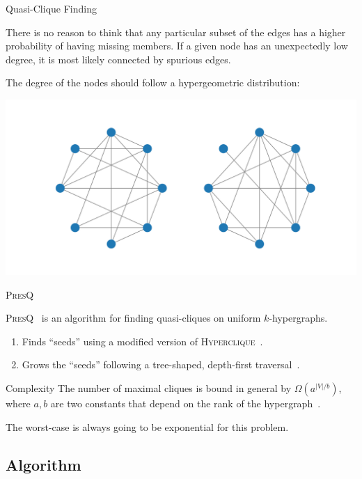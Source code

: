 \documentclass[10pt]{beamer}
\newcommand{\PresQ}[0]{\textsc{PresQ}\xspace}
\begin{document}
\begin{frame}{Quasi-Clique Finding}
    \begin{block}{}
    There is no reason to think that any particular subset of the edges
    has a higher probability of having missing members. If a given node has an
    unexpectedly low degree, it is most likely connected by spurious edges.
    
    The degree of the nodes should follow a hypergeometric distribution:
    \end{block}
    \centering
    \includegraphics[width=0.7\linewidth]{quasicliques}
\end{frame}

\begin{frame}{\PresQ}

    \begin{block}{}
    \PresQ~\cite{AlvarezAyllonPresQ2022} is an algorithm for finding quasi-cliques on uniform
    $k$-hypergraphs.
    
    \begin{enumerate}
        \item Finds ``seeds'' using a modified version of \textsc{Hyperclique}~\cite{koeller2003discovery}.
        \item Grows the ``seeds'' following a tree-shaped, depth-first
        traversal~\cite{uno_efficient_2010}.
    \end{enumerate}
    \end{block}
    
    \begin{alertblock}{Complexity}
        The number of maximal cliques is bound in general by $\Omega(a^{|V|/b})$,
        where $a, b$ are two constants that depend on the rank of the hypergraph~\cite{Tomescu1981}.
        
        The worst-case is always going to be exponential for this problem.
    \end{alertblock}
\end{frame}

\subsection{Algorithm}
\end{document}
